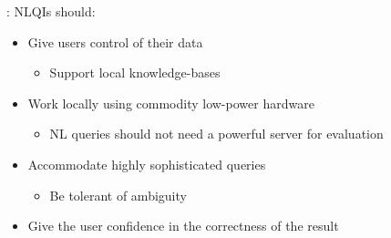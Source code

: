 \documentclass[logoontitle,tabu,supertabular,aspectratio=43]{preney-uwindsor-beamer}
\begin{document}
    \begin{frame}{\insertsection: \insertsubsection}
        NLQIs should:
        \begin{itemize}
            \item Give users control of their data
            \begin{itemize}
                \item Support local knowledge-bases
            \end{itemize}
            \item Work locally using commodity low-power hardware
            \begin{itemize}
                \item NL queries should not need a powerful server for evaluation
            \end{itemize}
            \item Accommodate highly sophisticated queries
            \begin{itemize}
                \item Be tolerant of ambiguity
            \end{itemize}
            \item Give the user confidence in the correctness of the result
        \end{itemize}
    \end{frame}

\end{document}
